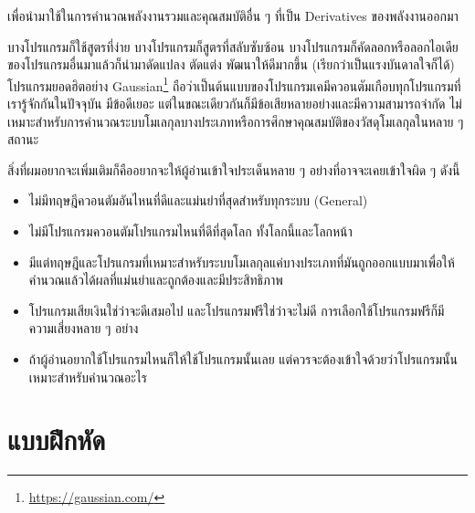 \noindent เพื่อนำมาใช้ในการคำนวณพลังงานรวมและคุณสมบัติอื่น ๆ ที่เป็น Derivatives ของพลังงานออกมา

บางโปรแกรมก็ใช้สูตรที่ง่าย บางโปรแกรมก็สูตรที่สลับซับซ้อน บางโปรแกรมก็คัดลอกหรือลอกไอเดียของโปรแกรมอื่นมาแล้วก็นำมาดัดแปลง ตัดแต่ง
พัฒนาให้ดีมากขึ้น (เรียกว่าเป็นแรงบันดาลใจก็ได้) โปรแกรมยอดฮิตอย่าง Gaussian\footnote{\url{https://gaussian.com/}}
ถือว่าเป็นต้นแบบของโปรแกรมเคมีควอนตัมเกือบทุกโปรแกรมที่เรารู้จักกันในปัจจุบัน มีข้อดีเยอะ แต่ในขณะเดียวกันก็มีข้อเสียหลายอย่างและมีความสามารถจำกัด
ไม่เหมาะสำหรับการคำนวณระบบโมเลกุลบางประเภทหรือการศึกษาคุณสมบัติของวัสดุโมเลกุลในหลาย ๆ สถานะ

สิ่งที่ผมอยากจะเพิ่มเติมก็คืออยากจะให้ผู้อ่านเข้าใจประเด็นหลาย ๆ อย่างที่อาจจะเคยเข้าใจผิด ๆ ดังนี้

\begin{itemize}[topsep=0pt]
  \item ไม่มีทฤษฎีควอนตัมอันไหนที่ดีและแม่นยำที่สุดสำหรับทุกระบบ (General)

  \item ไม่มีโปรแกรมควอนตัมโปรแกรมไหนที่ดีที่สุดโลก ทั้งโลกนี้และโลกหน้า

  \item มีแต่ทฤษฎีและโปรแกรมที่เหมาะสำหรับระบบโมเลกุลแค่บางประเภทที่มันถูกออกแบบมาเพื่อให้คำนวณแล้วได้ผลที่แม่นยำและถูกต้องและมีประสิทธิภาพ

  \item โปรแกรมเสียเงินใช่ว่าจะดีเสมอไป และโปรแกรมฟรีใช่ว่าจะไม่ดี การเลือกใช้โปรแกรมฟรีก็มีความเสี่ยงหลาย ๆ อย่าง

  \item ถ้าผู้อ่านอยากใช้โปรแกรมไหนก็ให้ใช้โปรแกรมนั้นเลย แต่ควรจะต้องเข้าใจด้วยว่าโปรแกรมนั้นเหมาะสำหรับคำนวณอะไร
\end{itemize}

\section{แบบฝึกหัด}
